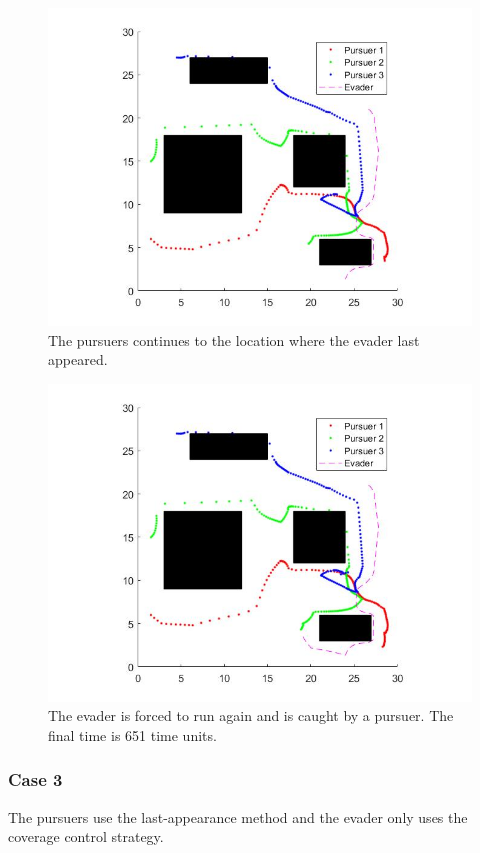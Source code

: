 \documentclass[ebook,11pt] {kth-mag}
\begin{document}
\begin{figure}[H]
\includegraphics[scale=0.4]{close_fifth_search_again}
\centering
\caption{The pursuers continues to the location where the evader last appeared.}
\end{figure}

\begin{figure}[H]
\includegraphics[scale=0.4]{close_finished}
\centering
\caption{The evader is forced to run again and is caught by a pursuer. The final time is 651 time units.}
\end{figure}

\subsubsection{Case 3}
The pursuers use the last-appearance method and the evader only uses the coverage control strategy. 
\end{document}
